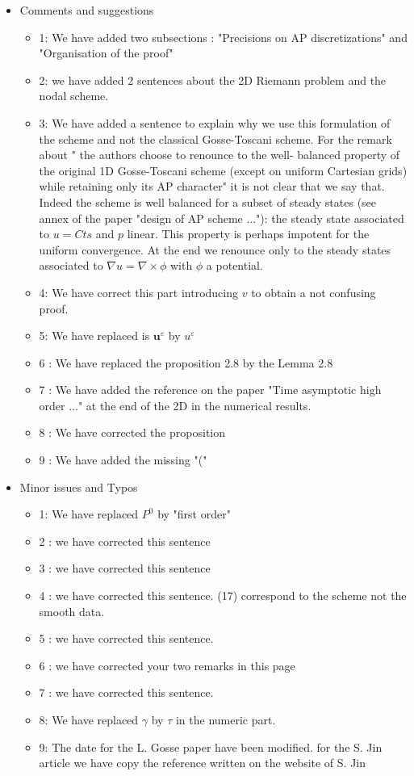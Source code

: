 \documentclass[a4paper,french,english,10pt]{article}
\newcommand{\eps}{\varepsilon}
\begin{document}
\begin{itemize}
\item Comments and suggestions
\begin{itemize}
\item 1: We have added two subsections : "Precisions on AP discretizations" and "Organisation of the proof"
\item 2: we have added 2 sentences about the 2D Riemann problem and the nodal scheme. 
\item 3: We have added a sentence to explain why we use this formulation of the scheme and not the classical Gosse-Toscani scheme. For the remark about " the authors choose to renounce to the well- balanced property of the original 1D Gosse-Toscani scheme (except on uniform Cartesian grids) while retaining only its AP character" it is not clear that we say that. Indeed the scheme is well balanced for a subset of steady states (see annex of the paper "design of AP scheme ..."): the steady state associated to $u=Cts$ and $p$ linear. This property is perhaps impotent for the uniform convergence. At the end we renounce only to the steady states associated to $\nabla{u}=\nabla\times \phi$ with $\phi$ a potential. 
\item 4: We have correct this part introducing $v$ to obtain a not confusing proof.
\item 5: We have replaced is $\mathbf{u}^{\eps}$ by $u^{\eps}$
\item 6 : We have replaced the proposition 2.8 by the Lemma 2.8
\item 7 : We have added the reference on the paper "Time asymptotic high order ..." at the end of the 2D in the numerical results.
\item 8 : We have corrected the proposition 
\item 9 : We have added the missing "("
\end{itemize}
\item Minor issues and Typos
\begin{itemize}
\item 1: We have replaced $P^0$ by "first order"
\item 2 : we have corrected this sentence 
\item 3 : we have corrected this sentence 
\item 4 : we have corrected this sentence. (17) correspond to the scheme not the smooth data.
\item 5 : we have corrected this sentence. 
\item 6 : we have corrected your two remarks in this page 
\item 7 : we have corrected this sentence. 
\item 8: We have replaced $\gamma$ by $\tau$ in the numeric part.
\item 9: The date for the L. Gosse paper have been modified. for the S. Jin article we have copy the reference written on the website of S. Jin 
\end{itemize}
\end{itemize}
\end{document}
